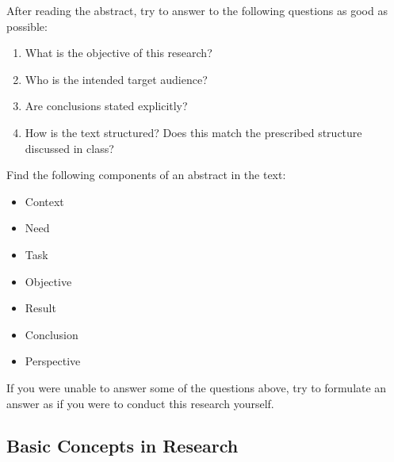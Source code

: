 \begin{exercise}
  After reading the abstract, try to answer to the following questions as good as possible:
  
  \begin{enumerate}
    \item What is the objective of this research?
    \item Who is the intended target audience?
    \item Are conclusions stated explicitly? 
    \item How is the text structured? Does this match the prescribed structure discussed in class?
  \end{enumerate}
\end{exercise}

\begin{exercise}
  Find the following components of an abstract in the text:
  
  \begin{itemize}
    \item Context
    \item Need
    \item Task
    \item Objective
    \item Result
    \item Conclusion
    \item Perspective
  \end{itemize}

  If you were unable to answer some of the questions above, try to formulate an answer as if you were to conduct this research yourself.
\end{exercise}

\subsection{Basic Concepts in Research}


